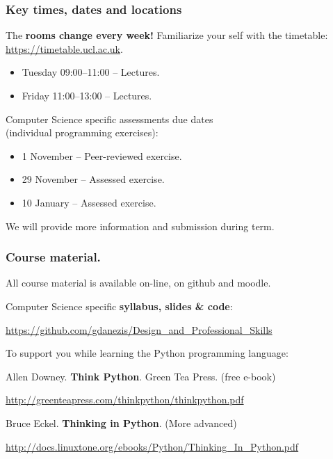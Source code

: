 \documentclass{beamer} %
\newcommand\emc[1]{\textcolor{brightblue}{\textbf{#1}}}
\begin{document}
\begin{frame}
\frametitle{Key times, dates and locations} 

The \emc{rooms change every week!}
Familiarize your self with the timetable: \url{https://timetable.ucl.ac.uk}.

\begin{itemize}
	\item Tuesday 09:00--11:00 -- Lectures.
	\item Friday 11:00--13:00 -- Lectures.
\end{itemize}

\vspace{3mm}
Computer Science specific assessments due dates \\ (individual programming exercises):
\begin{itemize}
	\item 1 November -- Peer-reviewed exercise.
	\item 29 November -- Assessed exercise.
	\item 10 January -- Assessed exercise.
\end{itemize}
We will provide more information and submission during term.


\end{frame}

\begin{frame}
\frametitle{Course material.} 

All course material is available on-line, on github and moodle.

\vspace{7mm}
Computer Science specific \emc{syllabus, slides \& code}: 

\url{https://github.com/gdanezis/Design_and_Professional_Skills}

\vspace{7mm}
To support you while learning the Python programming language:

\vspace{2mm}
Allen Downey. \emc{Think Python}. Green Tea Press. (free e-book)

\url{http://greenteapress.com/thinkpython/thinkpython.pdf}

\vspace{2mm}
Bruce Eckel. \emc{Thinking in Python}. (More advanced)

\url{http://docs.linuxtone.org/ebooks/Python/Thinking_In_Python.pdf}


\end{frame}
\end{document}
